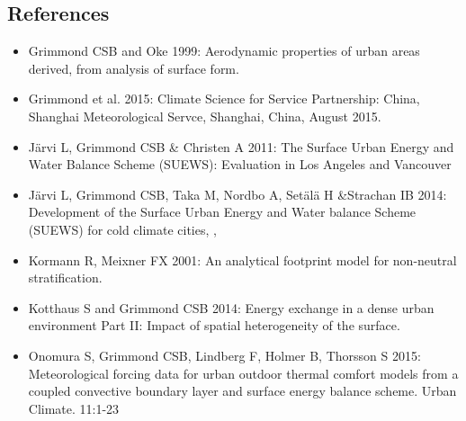 \documentclass[letterpaper,10pt,english]{sphinxmanual}
\begin{document}
\subsection{References}
\label{\detokenize{Tutorials/IntroductionToSuews:references}}\begin{itemize}
\item {} 
Grimmond CSB and Oke 1999: Aerodynamic properties of urban areas
derived, from analysis of surface form. 

\item {} 
Grimmond et al. 2015: Climate Science for Service Partnership: China,
Shanghai Meteorological Servce, Shanghai, China, August 2015.

\item {} 
Järvi L, Grimmond CSB \& Christen A 2011: The Surface Urban Energy and
Water Balance Scheme (SUEWS): Evaluation in Los Angeles and Vancouver

\item {} 
Järvi L, Grimmond CSB, Taka M, Nordbo A, Setälä H \&Strachan IB 2014:
Development of the Surface Urban Energy and Water balance Scheme
(SUEWS) for cold climate cities, , 

\item {} 
Kormann R, Meixner FX 2001: An analytical footprint model for
non-neutral stratification. 

\item {} 
Kotthaus S and Grimmond CSB 2014: Energy exchange in a dense urban
environment \textendash{} Part II: Impact of spatial heterogeneity of the
surface. 

\item {} 
Onomura S, Grimmond CSB, Lindberg F, Holmer B, Thorsson S 2015:
Meteorological forcing data for urban outdoor thermal comfort models
from a coupled convective boundary layer and surface energy balance
scheme. Urban Climate. 11:1-23 


\end{itemize}
\end{document}
